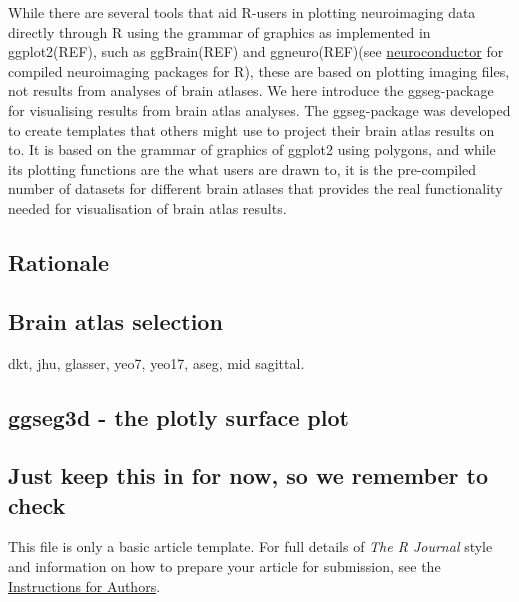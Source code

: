 While there are several tools that aid R-users in plotting neuroimaging
data directly through R using the grammar of graphics as implemented in
ggplot2(REF), such as ggBrain(REF) and ggneuro(REF)(see
\href{https://neuroconductor.org/}{neuroconductor} for compiled
neuroimaging packages for R), these are based on plotting imaging files,
not results from analyses of brain atlases. We here introduce the
ggseg-package for visualising results from brain atlas analyses. The
ggseg-package was developed to create templates that others might use to
project their brain atlas results on to. It is based on the grammar of
graphics of ggplot2 using polygons, and while its plotting functions are
the what users are drawn to, it is the pre-compiled number of datasets
for different brain atlases that provides the real functionality needed
for visualisation of brain atlas results.

\hypertarget{rationale}{%
\subsection{Rationale}\label{rationale}}

\hypertarget{brain-atlas-selection}{%
\subsection{Brain atlas selection}\label{brain-atlas-selection}}

dkt, jhu, glasser, yeo7, yeo17, aseg, mid sagittal.

\hypertarget{ggseg3d---the-plotly-surface-plot}{%
\subsection{ggseg3d - the plotly surface
plot}\label{ggseg3d---the-plotly-surface-plot}}

\hypertarget{just-keep-this-in-for-now-so-we-remember-to-check}{%
\subsection{Just keep this in for now, so we remember to
check}\label{just-keep-this-in-for-now-so-we-remember-to-check}}

This file is only a basic article template. For full details of
\emph{The R Journal} style and information on how to prepare your
article for submission, see the
\href{https://journal.r-project.org/share/author-guide.pdf}{Instructions
for Authors}.




